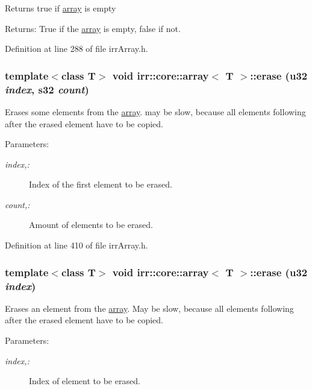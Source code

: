 Returns true if \hyperlink{classirr_1_1core_1_1array}{array} is empty \begin{Desc}
\item[Returns:]True if the \hyperlink{classirr_1_1core_1_1array}{array} is empty, false if not. \end{Desc}


Definition at line 288 of file irrArray.h.\hypertarget{classirr_1_1core_1_1array_2b749c99e727919254f1f0593fbd30ed}{
\subsubsection[{erase}]{\setlength{\rightskip}{0pt plus 5cm}template$<$class T$>$ void {\bf irr::core::array}$<$ T $>$::erase ({\bf u32} {\em index}, \/  {\bf s32} {\em count})}}
\label{classirr_1_1core_1_1array_2b749c99e727919254f1f0593fbd30ed}


Erases some elements from the \hyperlink{classirr_1_1core_1_1array}{array}. may be slow, because all elements following after the erased element have to be copied. \begin{Desc}
\item[Parameters:]
\begin{description}
\item[{\em index,:}]Index of the first element to be erased. \item[{\em count,:}]Amount of elements to be erased. \end{description}
\end{Desc}


Definition at line 410 of file irrArray.h.\hypertarget{classirr_1_1core_1_1array_a28ffba81d9af68bdc76fb2df1e10428}{
\subsubsection[{erase}]{\setlength{\rightskip}{0pt plus 5cm}template$<$class T$>$ void {\bf irr::core::array}$<$ T $>$::erase ({\bf u32} {\em index})}}
\label{classirr_1_1core_1_1array_a28ffba81d9af68bdc76fb2df1e10428}


Erases an element from the \hyperlink{classirr_1_1core_1_1array}{array}. May be slow, because all elements following after the erased element have to be copied. \begin{Desc}
\item[Parameters:]
\begin{description}
\item[{\em index,:}]Index of element to be erased. \end{description}
\end{Desc}


